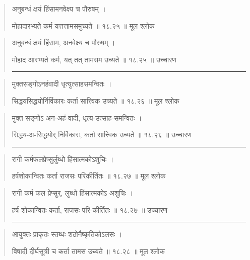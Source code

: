 \begin{quotation}

अनुबन्धं क्षयं हिंसामनवेक्ष्य च पौरुषम्‌  ।  

मोहादारभ्यते कर्म यत्तत्तामसमुच्यते  ॥ १८.२५ ॥  मूल श्लोक
\end{quotation}

\begin{quotation}

अनुबन्धं क्षयं हिंसाम, अनवेक्ष्य च पौरुषम्‌  ।  

मोहाद आरभ्यते कर्म, यत् तत् तामसम उच्यते  ॥ १८.२५ ॥  उच्चारण

\noindent\rule{16cm}{0.4pt} 
\end{quotation}


\begin{quotation}

मुक्तसङ्‍गोऽनहंवादी धृत्युत्साहसमन्वितः  ।  

सिद्धयसिद्धयोर्निर्विकारः कर्ता सात्त्विक उच्यते  ॥ १८.२६ ॥  मूल श्लोक
\end{quotation}

\begin{quotation}

मुक्त सङ्‍गोऽ अन-अहं-वादी, धृत्य-उत्साह-समन्वितः  ।  

सिद्धय-अ-सिद्धयोर् निर्विकारः, कर्ता सात्त्विक उच्यते  ॥ १८.२६ ॥  उच्चारण

\noindent\rule{16cm}{0.4pt} 
\end{quotation}


\begin{quotation}

रागी कर्मफलप्रेप्सुर्लुब्धो हिंसात्मकोऽशुचिः ।  

हर्षशोकान्वितः कर्ता राजसः परिकीर्तितः  ॥ १८.२७ ॥  मूल श्लोक
\end{quotation}

\begin{quotation}

रागी कर्म फल प्रेप्सुर्, लुब्धो हिंसात्मकोऽ अशुचिः ।  

हर्ष शोकान्वितः कर्ता, राजसः परि-कीर्तितः  ॥ १८.२७ ॥  उच्चारण

\noindent\rule{16cm}{0.4pt} 
\end{quotation}


\begin{quotation}

आयुक्तः प्राकृतः स्तब्धः शठोनैष्कृतिकोऽलसः  ।  

विषादी दीर्घसूत्री च कर्ता तामस उच्यते  ॥ १८.२८ ॥  मूल श्लोक
\end{quotation}


